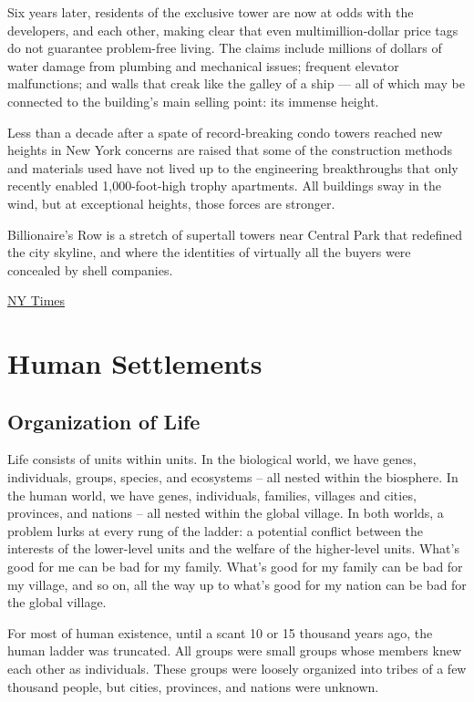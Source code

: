 \documentclass[
]{book}
\begin{document}
Six years later, residents of the exclusive tower are now at odds with the developers, and each other, making clear that even multimillion-dollar price tags do not guarantee problem-free living. The claims include millions of dollars of water damage from plumbing and mechanical issues; frequent elevator malfunctions; and walls that creak like the galley of a ship --- all of which may be connected to the building's main selling point: its immense height.

Less than a decade after a spate of record-breaking condo towers reached new heights in New York
concerns are raised that some of the construction methods and materials used
have not lived up to the engineering breakthroughs that only recently
enabled 1,000-foot-high trophy apartments.
All buildings sway in the wind, but at exceptional heights, those forces are stronger.

Billionaire's Row is a stretch of supertall towers near Central Park that redefined the city skyline,
and where the identities of virtually all the buyers were concealed by shell companies.

\href{https://www.nytimes.com/2021/02/03/realestate/luxury-high-rise-432-park.html}{NY Times}

\hypertarget{human-settlements}{%
\chapter{Human Settlements}\label{human-settlements}}

\hypertarget{organization-of-life}{%
\section{Organization of Life}\label{organization-of-life}}

Life consists of units within units. In the biological world, we have genes, individuals, groups, species, and ecosystems -- all nested within the biosphere. In the human world, we have genes, individuals, families, villages and cities, provinces, and nations -- all nested within the global village. In both worlds, a problem lurks at every rung of the ladder: a potential conflict between the interests of the lower-level units and the welfare of the higher-level units. What's good for me can be bad for my family. What's good for my family can be bad for my village, and so on, all the way up to what's good for my nation can be bad for the global village.

For most of human existence, until a scant 10 or 15 thousand years ago, the human ladder was truncated. All groups were small groups whose members knew each other as individuals. These groups were loosely organized into tribes of a few thousand people, but cities, provinces, and nations were unknown.
\end{document}
